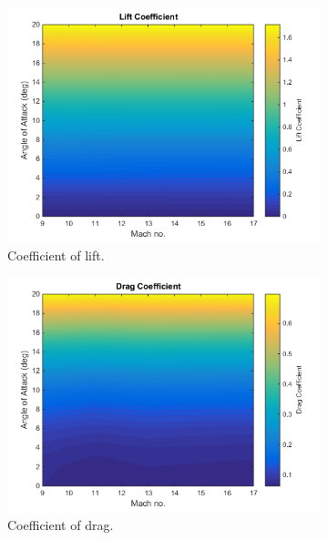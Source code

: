 		
		\begin{figure}
			\begin{subfigure}{.5\textwidth}
				\centering
				\includegraphics[width=0.99\linewidth]{figures/3_vehicle_design/ThirdStageCl}
				\caption{Coefficient of lift.}
				\label{fig:Cl-ThirdStage}
			\end{subfigure}
			\begin{subfigure}{.5\textwidth}
				\centering
				\includegraphics[width=0.99\linewidth]{figures/3_vehicle_design/ThirdStageCd}
				\caption{Coefficient of drag.}
				\label{fig:Cd-ThirdStage}
			\end{subfigure}
			\begin{subfigure}{.5\textwidth}
				\centering

\end{subfigure}
\end{figure}

